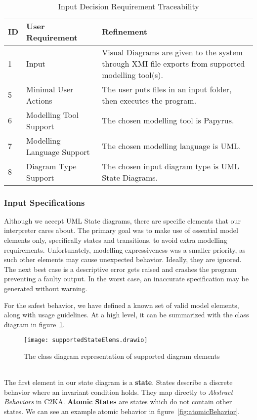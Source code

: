    \begin{table}[htbp]
    \centering
    \caption{Input Decision Requirement Traceability}\label{tab:input-table}\\
    \begin{tabularx}{\textwidth}{| l | l | X |}
        \hline
        \textbf{ID} & \textbf{User Requirement} & \textbf{Refinement} \\
        \hline
        1 & Input & Visual Diagrams are given to the system through XMI file exports from supported modelling tool(s). \\ \hline
        5 & Minimal User Actions & The user puts files in an input folder, then executes the program.  \\ \hline
        6 & Modelling Tool Support & The chosen modelling tool is Papyrus. \\ \hline
        7 & Modelling Language Support & The chosen modelling language is UML. \\ \hline
        8 & Diagram Type Support & The chosen input diagram type is UML State Diagrams. \\ \hline
    \end{tabularx}
    \end{table}

    \newpage
    \subsubsection{Input Specifications}\label{subsubsec:input-specification}
    Although we accept UML State diagrams, there are specific elements that our interpreter cares about.
    The primary goal was to make use of essential model elements only, specifically states and transitions,
    to avoid extra modelling requirements.
    Unfortunately, modelling expressiveness was a smaller priority, as such
    other elements may cause unexpected behavior.
    Ideally, they are ignored.
    The next best case is a descriptive error gets raised and crashes the program preventing a faulty output.
    In the worst case, an inaccurate specification may be generated without warning.

    For the safest behavior, we have defined a known set of valid model elements, along with usage guidelines.
    At a high level, it can be summarized with the class diagram in figure~\ref{fig:supportedElems}.
    \begin{figure}[h]
              \centering
              \texttt{[image: supportedStateElems.drawio]}
              \caption{The class diagram representation of supported diagram elements}
              \label{fig:supportedElems}
    \end{figure}
    \\
    The first element in our state diagram is a \textbf{state}.
    States describe a discrete behavior where an invariant condition holds.
    They map directly to \textit{Abstract Behaviors} in C2KA\@.
    \textbf{Atomic States} are states which do not contain other states.
    We can see an example atomic behavior in figure~\ref{fig:atomicBehavior}.


